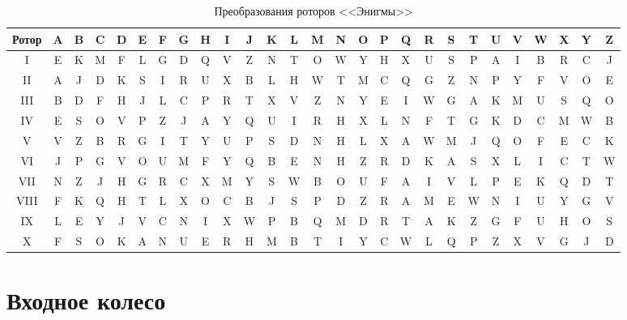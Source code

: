 \begin{table}[h]
\small
\setlength{\tabcolsep}{3pt}
	\begin{center}
		\begin{threeparttable}
		\captionsetup{justification=raggedright,singlelinecheck=off}
		\caption{\label{tbl:rotors} Преобразования роторов <<Энигмы>>}
		\begin{tabular}{|c|c|c|c|c|c|c|c|c|c|c|c|c|c|c|c|c|c|c|c|c|c|c|c|c|c|c|}
			\hline
			Ротор & A & B & C & D & E & F & G & H & I & J & K & L & M & N & O & P & Q & R & S & T & U & V & W & X & Y & Z \\
			\hline
			I & E & K & M & F & L & G & D & Q & V & Z & N & T & O & W & Y & H & X & U & S & P & A & I & B & R & C & J \\
			\hline
			II & A & J & D & K & S & I & R & U & X & B & L & H & W & T & M & C & Q & G & Z & N & P & Y & F & V & O & E \\
			\hline
			III & B & D & F & H & J & L & C & P & R & T & X & V & Z & N & Y & E & I & W & G & A & K & M & U & S & Q & O \\
			\hline
			IV & E & S & O & V & P & Z & J & A & Y & Q & U & I & R & H & X & L & N & F & T & G & K & D & C & M & W & B \\
			\hline
			V& V & Z & B & R & G & I & T & Y & U & P & S & D & N & H & L & X & A & W & M & J & Q & O & F & E & C & K \\
			\hline
			VI & J & P & G & V & O & U & M & F & Y & Q & B & E & N & H & Z & R & D & K & A & S & X & L & I & C & T & W \\
			\hline
			VII & N & Z & J & H & G & R & C & X & M & Y & S & W & B & O & U & F & A & I & V & L & P & E & K & Q & D & T \\
			\hline
			VIII & F & K & Q & H & T & L & X & O & C & B & J & S & P & D & Z & R & A & M & E & W & N & I & U & Y & G & V \\
			\hline
			IX & L & E & Y & J & V & C & N & I & X & W & P & B & Q & M & D & R & T & A & K & Z & G & F & U & H & O & S \\
			\hline
			X & F & S & O & K & A & N & U & E & R & H & M & B & T & I & Y & C & W & L & Q & P & Z & X & V & G & J & D \\
			\hline
		\end{tabular}
		\end{threeparttable}
	\end{center}
	
\end{table}

\section{Входное колесо}

